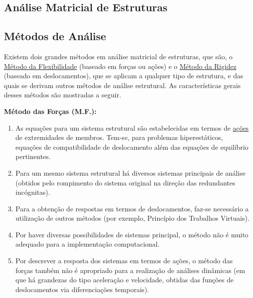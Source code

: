 \cleardoublepage

\begin{frontmatter}
	\chapter{Análise Matricial de Estruturas}
\end{frontmatter}

\section{Métodos de Análise}

Existem dois grandes métodos em análise matricial de estruturas, que são, o \underline{Método da Flexibilidade} (baseado em forças ou ações) e o \underline{Método da Rigidez} (baseado em deslocamentos), que se aplicam a qualquer tipo de estrutura, e das quais se derivam outros métodos de análise estrutural. As características gerais desses métodos são mostradas a seguir.

\bigskip

\noindent \textbf{Método das Forças (M.F.):}
\begin{enumerate}
	\item
	      As equações para um sistema estrutural são estabelecidas em termos de \underline{ações} de extremidades de membros. Tem-se, para problemas hiperestáticos, equações de compatibilidade de deslocamento além das equações de equilíbrio pertinentes.
	\item
	      Para um mesmo sistema estrutural há diversos sistemas principais de análise (obtidos pelo rompimento do sistema original na direção das redundantes incógnitas).
	\item
	      Para a obtenção de respostas em termos de deslocamentos, faz-se necessário a utilização de outros métodos (por exemplo, Princípio dos Trabalhos Virtuais).
	\item
	      Por haver diversas possibilidades de sistemas principal, o método não é muito adequado para a implementação computacional.
	\item
	      Por descrever a resposta dos sistemas em termos de ações, o método das forças também não é apropriado para a realização de análises dinâmicas (em que há grandezas do tipo aceleração e velocidade, obtidas das funções de deslocamentos via diferenciações temporais).
\end{enumerate}

\bigskip

